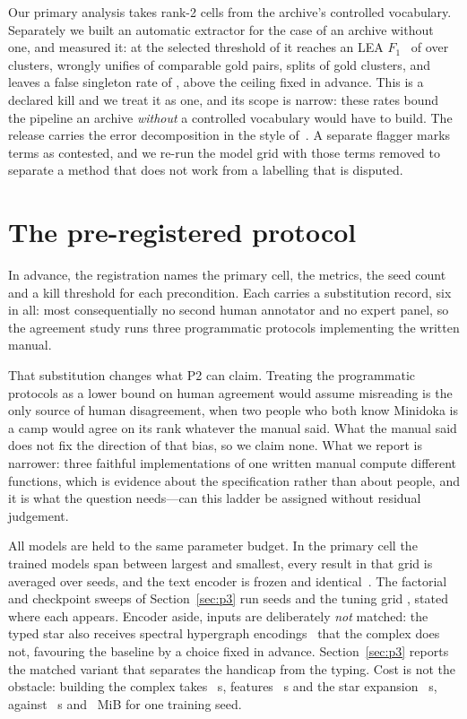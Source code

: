 \documentclass[conference]{IEEEtran}
\begin{document}
Our primary analysis takes rank-2 cells from the archive's controlled vocabulary. Separately
we built an automatic extractor for the case of an archive without one, and measured it: at
the selected threshold of \leaThreshold{} it reaches an LEA
$F_1$~\citep{moosavi2016lea} of \leaFone{} over \nExtractedEvents{} clusters, wrongly unifies
\rhoMerge{} of comparable gold pairs, splits \rhoSplit{} of gold clusters, and leaves a false
singleton rate of \falseSingleton{}, above the ceiling
fixed in advance. This is a declared kill and we treat it as one, and its scope is narrow: these rates bound
the pipeline an archive \emph{without} a controlled vocabulary would have to build. The release carries the
error decomposition in the style of~\citet{kummerfeld2013error}. A separate flagger marks
\nAmbiguous{} terms as contested, and we re-run the model grid with those terms removed to
separate a method that does not work from a labelling that is disputed.

\section{The pre-registered protocol}

In advance, the registration names the primary cell, the metrics, the seed count and a kill
threshold for each precondition. Each carries a substitution record, six in
all: most consequentially no second human annotator and no expert panel, so the agreement
study runs three programmatic protocols implementing the written manual.

That substitution changes what P2 can claim. Treating the programmatic protocols as a lower
bound on human agreement would assume misreading is the only source of human disagreement,
when two people who both know Minidoka is a camp would agree on its rank whatever the manual
said. What the manual said does not fix the direction of that bias, so we claim none. What we
report is
narrower: three faithful implementations of one written manual compute different functions,
which is evidence about the specification rather than about people, and it is what the
question needs---can this ladder be assigned without residual judgement.

All models are held to the same parameter budget. In the primary cell the trained models span
\paramSpread{} between largest and smallest, every result in that grid is averaged over
\nSeeds{} seeds, and the text encoder is frozen and identical~\citep{reimers2019sbert}. The
factorial and checkpoint sweeps of Section~\ref{sec:p3} run \facSeeds{} seeds and the tuning
grid \tuneSeeds{}, stated where each appears. Encoder aside, inputs
are deliberately \emph{not} matched: the typed star also receives spectral hypergraph
encodings~\citep{zhou2006hypergraph} that the complex does not, favouring the baseline by a
choice fixed in advance. Section~\ref{sec:p3} reports the matched variant that separates the
handicap from the typing. Cost is not the obstacle: building
the complex takes \costBuild{}~s, features \costFeat{}~s and the star expansion
\costStar{}~s, against \costTrain{}~s and \costGpu{}~MiB for one training seed.
\end{document}

